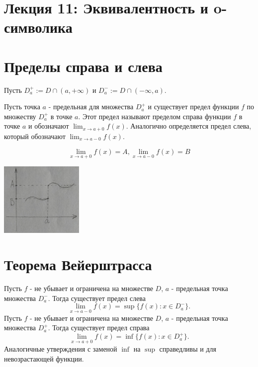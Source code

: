	\newpage
	
	\section*{Лекция 11: Эквивалентность и o-символика}
	
	\section{Пределы справа и слева}
	
	Пусть $D^+_a := D \cap (a, +\infty)$ и $D^-_a := D \cap (-\infty, a).$
	
	\begin{definition}
		Пусть точка $a$ - предельная для множества $D^+_a$ и существует предел функции $f$ по множеству $D^+_a$ в точке $a$. Этот предел называют пределом справа функции $f$ в точке $a$ и обозначают $\lim_{x \to a + 0} f(x)$. Аналогично определяется предел слева, который обозначают $\lim_{x \to a - 0} f(x)$.
	\end{definition}
	\[ \lim_{x \to a + 0} f(x) = A, \lim_{x \to a - 0} f(x) = B \]
	\begin{center}
		\includegraphics[width=0.3\textwidth]{img/lecture11/right_and_left_limit}
	\end{center}
	
	\section{Теорема Вейерштрасса}
	
	\begin{theorem}
		Пусть $f$ - не убывает и ограничена на множестве $D$, $a$ - предельная точка множества $D^-_a$. Тогда существует предел слева
		\[ \lim_{x \to a - 0} f(x) = \sup\{f(x) : x \in D^-_a\}. \]
		Пусть $f$ - не убывает и ограничена на множестве $D$, $a$ - предельная точка множества $D^+_a$. Тогда существует предел справа
		\[ \lim_{x \to a + 0} f(x) = \inf\{f(x) : x \in D^+_a\}. \]
		Аналогичные утверждения с заменой $\inf$ на $\sup$ справедливы и для невозрастающей функции.
	\end{theorem}
	
